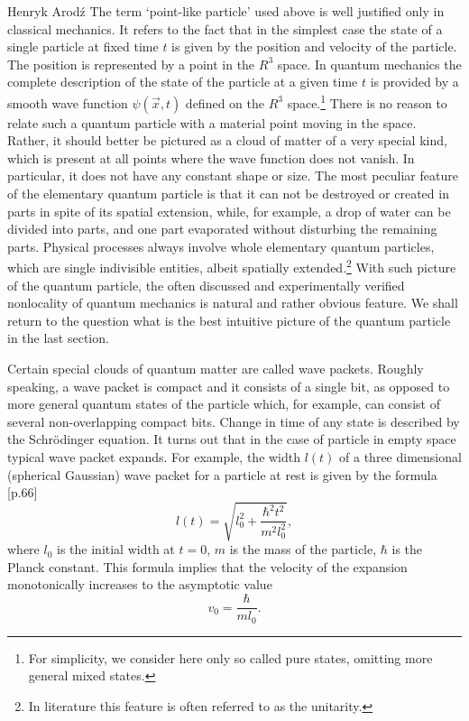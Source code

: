 \begin{artengenv}{Henryk Arod\'z}
The term `point-like particle' used above is well justified only in classical mechanics. It refers to the fact that in the simplest case the state of a single particle at fixed time $t$ is given by the position and velocity of the particle. The position is represented by a point in the $R^3$ space. In quantum mechanics the complete description of the state of the particle at a given time $t$ is provided by a smooth wave function $\psi(\vec{x}, t)$ defined on the $R^3$ space.\footnote{For simplicity, we consider here only so called pure states, omitting more general mixed states.} 
There is no reason to relate such a quantum particle with a material point moving in the space. Rather, it should better be pictured as a cloud of matter of a very special kind, which is present at all points where the wave function does not vanish. In particular, it does not have any constant shape or size. The most peculiar feature of the elementary quantum particle is that it can not be destroyed or created in parts in spite of its spatial extension, while, for example, a drop of water can be divided into parts, and one part evaporated without disturbing the remaining parts. Physical processes always involve whole elementary quantum particles, which are single indivisible entities, albeit spatially extended.\footnote{In literature this feature is often referred to as the unitarity.} With such picture of the quantum particle, the often discussed and experimentally verified nonlocality of quantum mechanics is natural and rather obvious feature. We shall return to the question what is the best intuitive picture of the quantum particle in the last section. 

Certain special clouds of quantum matter are called wave packets. Roughly speaking, a wave packet is compact and it consists of a single bit, as opposed to more general quantum states of the particle which, for example, can consist of several non-overlapping compact bits. 
Change in time of any state is described by the Schr\"odinger equation.
It turns out that in the case of particle in empty space typical wave packet expands. For example, the width $l(t)$ of a
 three dimensional (spherical Gaussian) wave packet for a particle at rest is given by the formula [p.66]\parencite{qmtext}
\[ l(t) = \sqrt{l^2_0 + \frac{\hbar^2 t^2}{ m^2 l_0^2}}, \]
where $l_0$ is the initial width at $t=0$, $m$ is the mass of the particle, $\hbar$ is the Planck constant. This formula implies that the velocity of the expansion monotonically increases to the asymptotic value
\[ v_0 = \frac{\hbar}{ m l_0}.\]


\end{artengenv}
